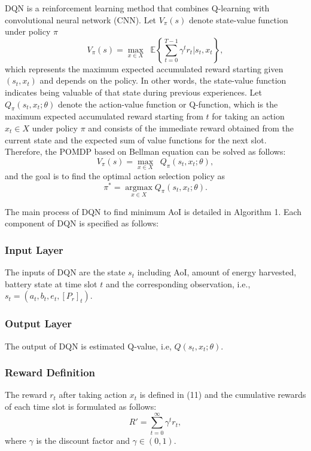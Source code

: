 \documentclass[journal]{IEEEtran}
\begin{document}
		DQN is a reinforcement learning method that combines Q-learning with convolutional neural network (CNN). Let ${V_\pi }(s)$ denote state-value function under policy $\pi$
		\begin{equation}
			{V_\pi }(s) = \mathop {\max }\limits_{x \in X} \;\; \mathbb{E} \left\{ \sum\limits_{t = 0}^{T - 1} {{\gamma ^t}r_t|{s_t},{x_t}} \right\},
		\end{equation}
		which represents the maximum expected accumulated reward starting given $({s_t},{x_t})$ and depends on the policy. In other words, the state-value function indicates being valuable of that state during previous experiences. Let ${Q_\pi }({s_t},{x_t};\theta )$ denote the action-value function or Q-function, which is the maximum expected accumulated reward starting from $t$ for taking an action ${x_t \in X}$ under policy ${\pi}$ and consists of the immediate reward obtained from the current state and the expected sum of value functions for the next slot. Therefore, the POMDP based on Bellman equation can be solved as follows:
		\begin{equation}
			{V_\pi }(s) = \mathop {\max }\limits_{x \in X} \;\;{Q_\pi }({s_t},{x_t};\theta ),
		\end{equation}
		and the goal is to find the optimal action selection policy as
		\begin{equation}
			{\pi ^*} = \mathop {\arg \max }\limits_{x \in X}  {Q_\pi }({s_t},{x_t};\theta ).
		\end{equation}

		The main process of DQN to find minimum AoI is detailed in Algorithm 1. Each component of DQN is specified as follows:
		\subsubsection{Input Layer}
			The inputs of DQN are the state $s_t$ including AoI, amount of energy harvested, battery state at time slot $t$ and the corresponding observation, i.e., ${s_t} = ({a_t},{b_t},{e_t},{[{P_r}]_{t}})$.
		\subsubsection{Output Layer}
			The output of DQN is estimated Q-value, i.e, $Q({s_t},{x_t};\theta )$.
		\subsubsection{Reward Definition}
			The reward $r_t$ after taking action $x_t$ is defined in (11) and the cumulative rewards of each time slot is formulated as follows:
			\begin{equation}
				R' = \sum\limits_{t = 0}^\infty  {{\gamma ^t}{r_t}},
			\end{equation}
			where $\gamma$ is the discount factor and $\gamma \in (0,1)$.
\end{document}
